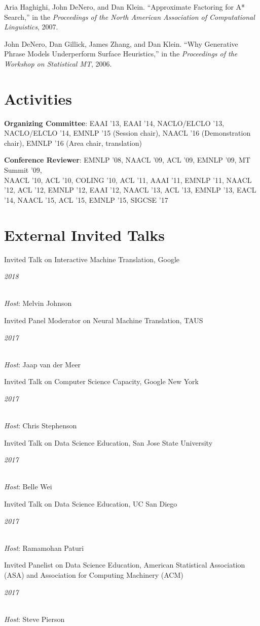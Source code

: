 \documentclass[margin,line]{res}
\newcommand{\dated}[2]{\parbox[t]{4.4in}{#1} \hspace{0.4in}
											 \parbox[t]{1in}{ {\it #2 } } }
\begin{document}
\begin{resume}
Aria Haghighi, John DeNero, and Dan Klein. ``Approximate Factoring for A* Search,'' in the {\it Proceedings of the North American Association of Computational Linguistics}, 2007.

John DeNero, Dan Gillick, James Zhang, and Dan Klein. ``Why Generative Phrase Models Underperform Surface Heuristics,'' in the {\it Proceedings of the Workshop on Statistical MT}, 2006.

\section{\sc Activities}

{\bf Organizing Committee}: EAAI '13, EAAI '14, NACLO/ELCLO '13, NACLO/ELCLO
'14, EMNLP '15 (Session chair), NAACL '16 (Demonstration chair), EMNLP '16 (Area
chair, translation)

{\bf Conference Reviewer}: EMNLP '08, NAACL '09, ACL '09, EMNLP '09, MT Summit
'09,\\ NAACL '10, ACL '10, COLING '10, ACL '11, AAAI '11, EMNLP '11, NAACL '12,
ACL '12, EMNLP '12, EAAI '12, NAACL '13, ACL '13, EMNLP '13, EACL '14,
NAACL '15, ACL '15, EMNLP '15, SIGCSE '17

\section{\sc External Invited Talks }

\dated{Invited Talk on Interactive Machine Translation, Google} {2018} \\
{\em Host}: Melvin Johnson

\dated{Invited Panel Moderator on Neural Machine Translation, TAUS}{2017} \\
{\em Host}: Jaap van der Meer

\dated{Invited Talk on Computer Science Capacity, Google New York}{2017} \\
{\em Host}: Chris Stephenson

\dated{Invited Talk on Data Science Education, San Jose State University}{2017} \\
{\em Host}: Belle Wei

\dated{Invited Talk on Data Science Education, UC San Diego}{2017} \\
{\em Host}: Ramamohan Paturi

\dated{Invited Panelist on Data Science Education, American Statistical Association (ASA) and Association for Computing Machinery (ACM)}{2017} \\
{\em Host}: Steve Pierson


\end{resume}
\end{document}
